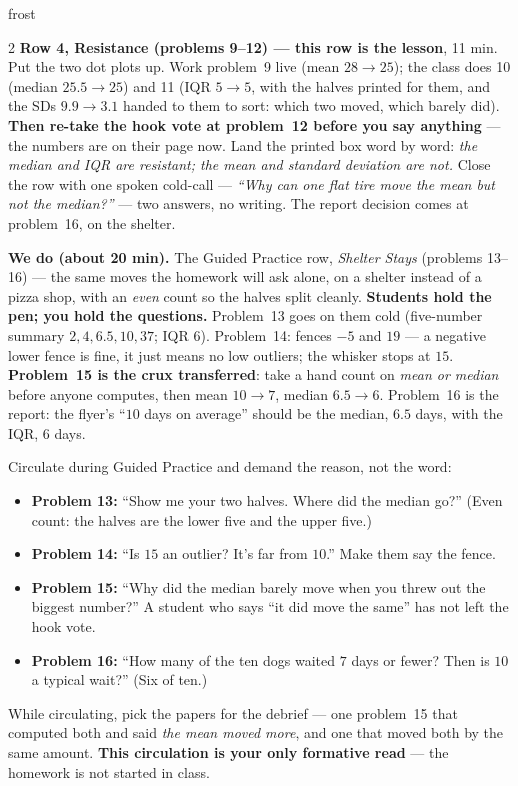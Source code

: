\documentclass[10pt]{article}
\begin{document}
\begin{skillbox}{frost}
\begin{multicols}{2}
\textbf{Row 4, Resistance (problems 9--12) --- this row is the lesson}, 11 min. Put the two dot
plots up. Work problem~9 live (mean $28 \to 25$); the class does 10 (median $25.5 \to 25$) and
11 (IQR $5 \to 5$, with the halves printed for them, and the SDs $9.9 \to 3.1$ handed to them
to sort: which two moved, which barely did). \textbf{Then re-take the hook vote at problem~12
before you say anything} --- the numbers are on their page now. Land the printed box word by
word: \emph{the median and IQR are resistant; the mean and standard deviation are not.} Close
the row with one spoken cold-call --- \emph{``Why can one flat tire move the mean but not the
median?''} --- two answers, no writing. The report decision comes at problem~16, on the
shelter.

\columnbreak
\textbf{We do (about 20 min).} The Guided Practice row, \emph{Shelter Stays} (problems 13--16)
--- the same moves the homework will ask alone, on a shelter instead of a pizza shop, with an
\emph{even} count so the halves split cleanly. \textbf{Students hold the pen; you hold the
questions.} Problem~13 goes on them cold (five-number summary $2, 4, 6.5, 10, 37$; IQR $6$).
Problem~14: fences $-5$ and $19$ --- a negative lower fence is fine, it just means no low
outliers; the whisker stops at $15$. \textbf{Problem~15 is the crux transferred}: take a hand
count on \emph{mean or median} before anyone computes, then mean $10 \to 7$, median
$6.5 \to 6$. Problem~16 is the report: the flyer's ``$10$ days on average'' should be the
median, $6.5$ days, with the IQR, $6$ days.

Circulate during Guided Practice and demand the reason, not the word:
\begin{itemize}[leftmargin=1.1em, nosep]
  \item \textbf{Problem 13:} ``Show me your two halves. Where did the median go?'' (Even count:
        the halves are the lower five and the upper five.)
  \item \textbf{Problem 14:} ``Is $15$ an outlier? It's far from $10$.'' Make them say the fence.
  \item \textbf{Problem 15:} ``Why did the median barely move when you threw out the biggest
        number?'' A student who says ``it did move the same'' has not left the hook vote.
  \item \textbf{Problem 16:} ``How many of the ten dogs waited $7$ days or fewer? Then is $10$
        a typical wait?'' (Six of ten.)
\end{itemize}
While circulating, pick the papers for the debrief --- one problem~15 that computed both and
said \emph{the mean moved more}, and one that moved both by the same amount. \textbf{This
circulation is your only formative read} --- the homework is not started in class.
\end{multicols}
\end{skillbox}
\end{document}
